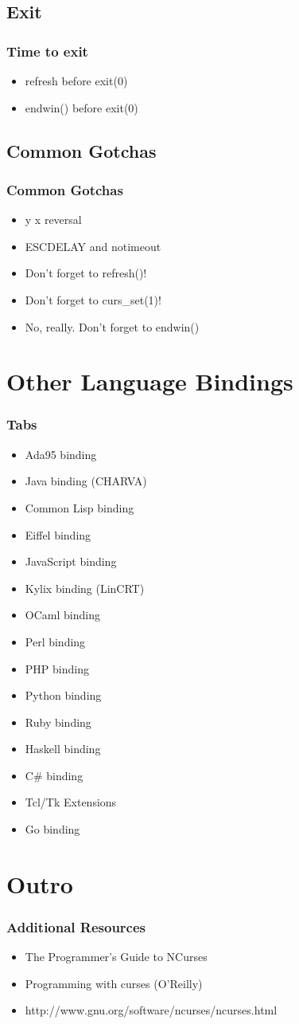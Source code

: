 \documentclass{beamer}
\begin{document}
\subsection{Exit}
\frame
{
    \frametitle{Time to exit}

    \begin{itemize}
        \item refresh before exit(0)
        \item endwin() before exit(0)
    \end{itemize}
}

\subsection{Common Gotchas}
\frame
{
    \frametitle{Common Gotchas}

    \begin{itemize}
        \item y x reversal
        \item ESCDELAY and notimeout
        \item Don't forget to refresh()!
        \item Don't forget to curs\_set(1)!
        \item No, really. Don't forget to endwin()
    \end{itemize}
}

\section{Other Language Bindings}
\frame
{
    \frametitle{Tabs}


    \begin{itemize}
        \small
        \item Ada95 binding
        \item Java binding (CHARVA)
        \item Common Lisp binding
        \item Eiffel binding
        \item JavaScript binding
        \item Kylix binding (LinCRT) 
        \item OCaml binding
        \item Perl binding
        \item PHP binding
        \item Python binding
        \item Ruby binding
        \item Haskell binding
        \item C\# binding
        \item Tcl/Tk Extensions 
        \item Go binding
    \end{itemize}
}

\section{Outro}
\frame
{
    \frametitle{Additional Resources}

    \begin{itemize}
        \item The Programmer's Guide to NCurses
        \item Programming with curses (O'Reilly)
        \item http://www.gnu.org/software/ncurses/ncurses.html
    \end{itemize}
}
\end{document}
